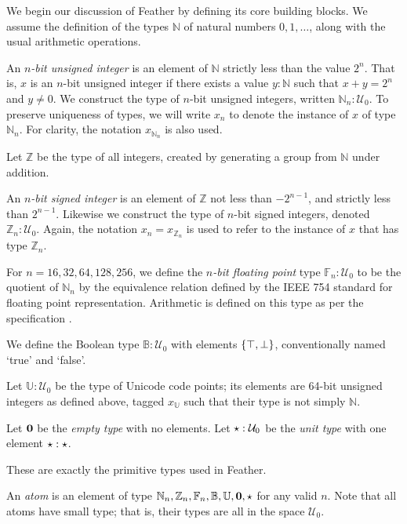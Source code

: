 \documentclass[UKenglish, 11pt, a4paper, parskip=half]{scrbook}
\begin{document}
We begin our discussion of Feather by defining its core building blocks.
We assume the definition of the types \( \mathbb N \) of natural numbers \( 0, 1, \dots \), along with the usual arithmetic operations.
\begin{defn}
    An \textit{\( n \)-bit unsigned integer} is an element of \( \mathbb N \) strictly less than the value \( 2^n \).
    That is, \( x \) is an \( n \)-bit unsigned integer if there exists a value \( y : \mathbb N \) such that \( x + y = 2^n \) and \( y \neq 0 \).
    We construct the type of \( n \)-bit unsigned integers, written \( \mathbb N_n : \mathcal U_0 \).
    To preserve uniqueness of types, we will write \( x_n \) to denote the instance of \( x \) of type \( \mathbb N_n \).
    For clarity, the notation \( x_{\mathbb N_n} \) is also used.
\end{defn}
Let \( \mathbb Z \) be the type of all integers, created by generating a group from \( \mathbb N \) under addition.
\begin{defn}
    An \textit{\( n \)-bit signed integer} is an element of \( \mathbb Z \) not less than \( -2^{n-1} \), and strictly less than \( 2^{n-1} \).
    Likewise we construct the type of \( n \)-bit signed integers, denoted \( \mathbb Z_n : \mathcal U_0 \).
    Again, the notation \( x_n = x_{\mathbb Z_n} \) is used to refer to the instance of \( x \) that has type \( \mathbb Z_n \).
\end{defn}
\begin{defn}
    For \( n = 16, 32, 64, 128, 256 \), we define the \textit{\( n \)-bit floating point} type \( \mathbb F_n : \mathcal U_0 \) to be the quotient of \( \mathbb N_n \) by the equivalence relation defined by the IEEE 754 standard for floating point representation.
    Arithmetic is defined on this type as per the specification \cite{IEEE754}.
\end{defn}
\begin{defn}
    We define the Boolean type \( \mathbb B : \mathcal U_0 \) with elements \( \qty{\top, \bot} \), conventionally named `true' and `false'.
\end{defn}
\begin{defn}
    Let \( \mathbb U : \mathcal U_0 \) be the type of Unicode code points; its elements are 64-bit unsigned integers as defined above, tagged \( x_{\mathbb U} \) such that their type is not simply \( \mathbb N \).
\end{defn}
\begin{defn}
    Let \( \mathbf{0} \) be the \textit{empty type} with no elements.
    Let \( \star : \mathcal U_0 \) be the \textit{unit type} with one element \( \star : \star \).
\end{defn}
These are exactly the primitive types used in Feather.
\begin{defn}
    An \textit{atom} is an element of type \( \mathbb N_n, \mathbb Z_n, \mathbb F_n, \mathbb B, \mathbb U, \mathbf{0}, \star \) for any valid \( n \).
    Note that all atoms have small type; that is, their types are all in the space \( \mathcal U_0 \).
\end{defn}
\end{document}
